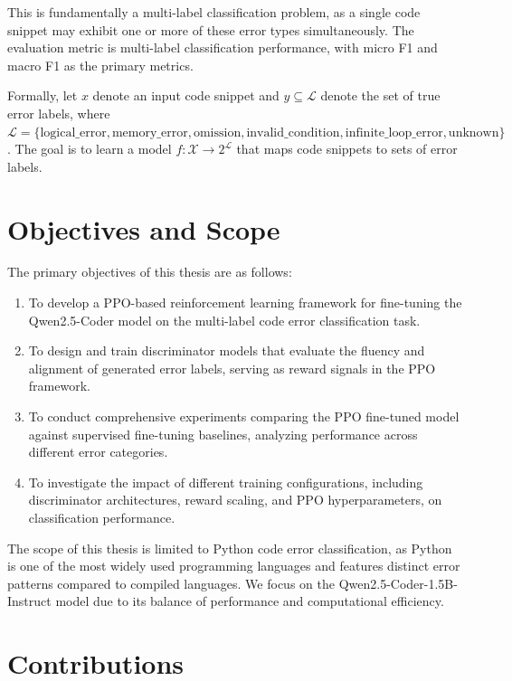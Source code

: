 This is fundamentally a multi-label classification problem, as a single code snippet may exhibit one or more of these error types simultaneously. The evaluation metric is multi-label classification performance, with micro F1 and macro F1 as the primary metrics.

Formally, let $x$ denote an input code snippet and $y \subseteq \mathcal{L}$ denote the set of true error labels, where $\mathcal{L} = \{\text{logical\_error}, \text{memory\_error}, \text{omission}, \text{invalid\_condition}, \text{infinite\_loop\_error}, \text{unknown}\}$. The goal is to learn a model $f: \mathcal{X} \rightarrow 2^{\mathcal{L}}$ that maps code snippets to sets of error labels.

\section{Objectives and Scope}

The primary objectives of this thesis are as follows:

\begin{enumerate}
    \item To develop a PPO-based reinforcement learning framework for fine-tuning the Qwen2.5-Coder model on the multi-label code error classification task.
    \item To design and train discriminator models that evaluate the fluency and alignment of generated error labels, serving as reward signals in the PPO framework.
    \item To conduct comprehensive experiments comparing the PPO fine-tuned model against supervised fine-tuning baselines, analyzing performance across different error categories.
    \item To investigate the impact of different training configurations, including discriminator architectures, reward scaling, and PPO hyperparameters, on classification performance.
\end{enumerate}

The scope of this thesis is limited to Python code error classification, as Python is one of the most widely used programming languages and features distinct error patterns compared to compiled languages. We focus on the Qwen2.5-Coder-1.5B-Instruct model due to its balance of performance and computational efficiency.

\section{Contributions}

